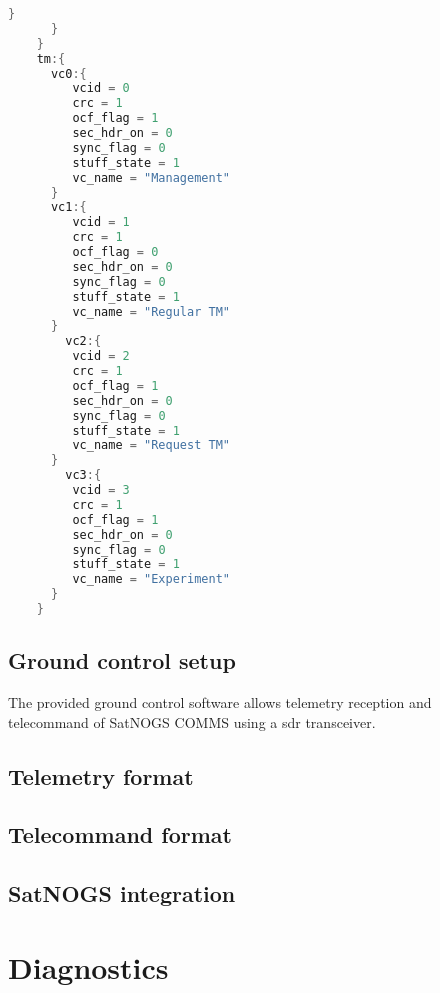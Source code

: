 \documentclass[english,title,a4paper]{report}
\begin{document}
\begin{lstlisting}[language=C, caption = FOP example configuration]
         }
      }
    }
    tm:{
      vc0:{
         vcid = 0
         crc = 1
         ocf_flag = 1
         sec_hdr_on = 0
         sync_flag = 0
         stuff_state = 1
         vc_name = "Management"
      }
      vc1:{
         vcid = 1
         crc = 1
         ocf_flag = 0
         sec_hdr_on = 0
         sync_flag = 0
         stuff_state = 1
         vc_name = "Regular TM"
      }
        vc2:{
         vcid = 2
         crc = 1
         ocf_flag = 1
         sec_hdr_on = 0
         sync_flag = 0
         stuff_state = 1
         vc_name = "Request TM"
      }
        vc3:{
         vcid = 3
         crc = 1
         ocf_flag = 1
         sec_hdr_on = 0
         sync_flag = 0
         stuff_state = 1
         vc_name = "Experiment"
      }
    }
\end{lstlisting}

\section{Ground control setup}\label{ground-control-setup}

The provided ground control software allows telemetry reception and telecommand of SatNOGS COMMS using a \acrshort{sdr} transceiver.

\section{Telemetry format}\label{telemetry-format}

\section{Telecommand format}\label{telecommand-format}

\section{SatNOGS integration}\label{satnogs-integration}

\chapter{Diagnostics}\label{diagnostics}
\end{document}
